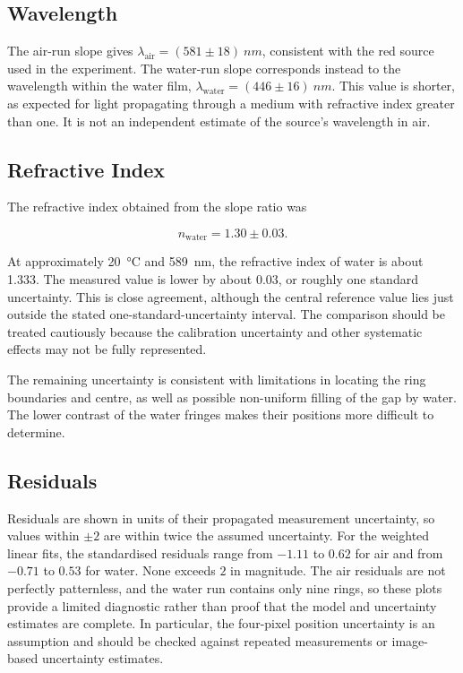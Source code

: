 \documentclass[12pt,a4paper]{article}
\begin{document}
\subsection{Wavelength}

The air-run slope gives
$\lambda_{\mathrm{air}}=(581\pm18)\ \si{nm}$, consistent
with the red source used in the experiment. The
water-run slope corresponds instead to the wavelength
within the water film,
$\lambda_{\mathrm{water}}=(446\pm16)\ \si{nm}$. This value
is shorter, as expected for light propagating through
a medium with refractive index greater than one. It is
not an independent estimate of the source's wavelength
in air.

\subsection{Refractive Index}

The refractive index obtained from
the slope ratio was

\[
n_{\mathrm{water}}=1.30 \pm 0.03.
\]

At approximately \SI{20}{\degreeCelsius} and \SI{589}{nm}, the refractive index of water is about 1.333\cite{daimon2007}. The measured value is lower by about 0.03, or roughly one standard uncertainty. This is close agreement, although the central reference value lies just outside the stated one-standard-uncertainty interval. The comparison should be treated cautiously because the calibration uncertainty and other systematic effects may not be fully represented.

The remaining uncertainty is consistent with limitations in locating the ring boundaries and centre, as well as possible non-uniform filling of the gap by water. The lower contrast of the water fringes makes their positions more difficult to determine.

\subsection{Residuals}

Residuals are shown in units of their propagated measurement uncertainty, so values within $\pm2$ are within twice the assumed uncertainty. For the weighted linear fits, the standardised residuals range from $-1.11$ to $0.62$ for air and from $-0.71$ to $0.53$ for water. None exceeds $2$ in magnitude. The air residuals are not perfectly patternless, and the water run contains only nine rings, so these plots provide a limited diagnostic rather than proof that the model and uncertainty estimates are complete. In particular, the four-pixel position uncertainty is an assumption and should be checked against repeated measurements or image-based uncertainty estimates.
\end{document}
